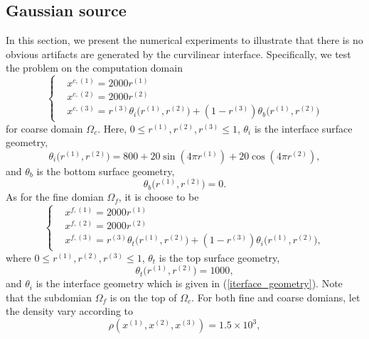 \subsection{Gaussian source}\label{gaussian_source}
In this section, we present the numerical experiments to illustrate that there is no obvious artifacts are generated by the curvilinear interface. Specifically, we test the problem on the computation domain
\begin{equation}
\left\{
\begin{aligned}
& x^{c,(1)} = 2000 r^{(1)}\\
& x^{c,(2)} = 2000 r^{(2)}\\
& x^{c,(3)} = r^{(3)} \theta_i\big(r^{(1)},r^{(2)}\big) + (1-r^{(3)}) \theta_b\big(r^{(1)},r^{(2)}\big)
\end{aligned}
\right.
\end{equation}
for coarse domain $\Omega_c$. Here, $0\leq r^{(1)}, r^{(2)}, r^{(3)}\leq 1$, $\theta_i$ is the interface surface geometry,
\begin{equation}
\theta_i\big(r^{(1)},r^{(2)}\big) = 800+20\sin(4\pi r^{(1)})+20\cos(4\pi r^{(2)}),
\end{equation}
and 
$\theta_b$ is the bottom surface geometry,
\begin{equation}
\theta_b\big(r^{(1)},r^{(2)}\big) = 0.
\end{equation}
As for the fine domian $\Omega_f$, it is choose to be
\begin{equation}
\left\{
\begin{aligned}
& x^{f,(1)} = 2000 r^{(1)}\\
& x^{f,(2)} = 2000 r^{(2)}\\
& x^{f,(3)} = r^{(3)}\theta_t\big(r^{(1)},r^{(2)}\big) + (1-r^{(3)})\theta_i\big(r^{(1)},r^{(2)}\big),
\end{aligned}
\right.
\end{equation}
where $0\leq r^{(1)}, r^{(2)}, r^{(3)}\leq 1$, $\theta_t$ is the top surface geometry,
\begin{equation}
\theta_t\big(r^{(1)},r^{(2)}\big) = 1000,
\end{equation}
and $\theta_i$ is the interface geometry which is given in (\ref{iterface_geometry}). Note that the subdomian 
$\Omega_f$ is on the top of $\Omega_c$. For both fine and coarse domians, let the density vary according to
\begin{equation}
\rho(x^{(1)},x^{(2)},x^{(3)}) = 1.5\times 10^3,
\end{equation}
